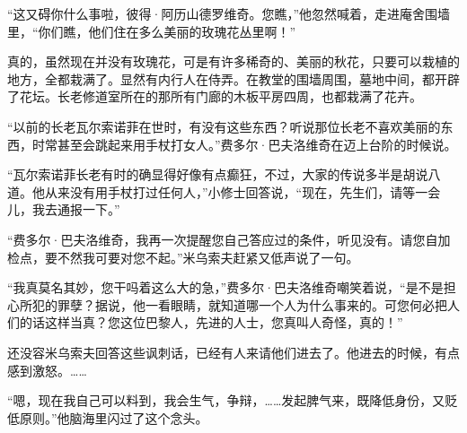 \par “这又碍你什么事啦，彼得·阿历山德罗维奇。您瞧，”他忽然喊着，走进庵舍围墙里，“你们瞧，他们住在多么美丽的玫瑰花丛里啊！”
\par 真的，虽然现在并没有玫瑰花，可是有许多稀奇的、美丽的秋花，只要可以栽植的地方，全都栽满了。显然有内行人在侍弄。在教堂的围墙周围，墓地中间，都开辟了花坛。长老修道室所在的那所有门廊的木板平房四周，也都栽满了花卉。
\par “以前的长老瓦尔索诺菲在世时，有没有这些东西？听说那位长老不喜欢美丽的东西，时常甚至会跳起来用手杖打女人。”费多尔·巴夫洛维奇在迈上台阶的时候说。
\par “瓦尔索诺菲长老有时的确显得好像有点癫狂，不过，大家的传说多半是胡说八道。他从来没有用手杖打过任何人，”小修士回答说，“现在，先生们，请等一会儿，我去通报一下。”
\par “费多尔·巴夫洛维奇，我再一次提醒您自己答应过的条件，听见没有。请您自加检点，要不然我可要对您不起。”米乌索夫赶紧又低声说了一句。
\par “我真莫名其妙，您干吗着这么大的急，”费多尔·巴夫洛维奇嘲笑着说，“是不是担心所犯的罪孽？据说，他一看眼睛，就知道哪一个人为什么事来的。可您何必把人们的话这样当真？您这位巴黎人，先进的人士，您真叫人奇怪，真的！”
\par 还没容米乌索夫回答这些讽刺话，已经有人来请他们进去了。他进去的时候，有点感到激怒。……
\par “嗯，现在我自己可以料到，我会生气，争辩，……发起脾气来，既降低身份，又贬低原则。”他脑海里闪过了这个念头。
